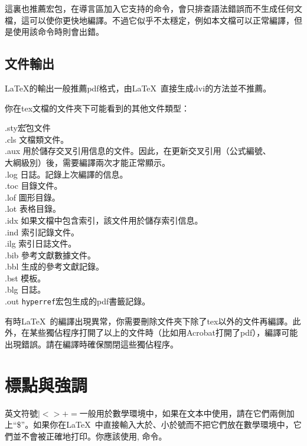 這裏也推薦宏包，在導言區加入它支持的命令，會只排查語法錯誤而不生成任何文檔，這可以使你更快地編譯。不過它似乎不太穩定，例如本文檔可以正常編譯，但是使用該命令時則會出錯。

\subsection{文件輸出}
\LaTeX{}的輸出一般推薦pdf格式，由\LaTeX\ 直接生成dvi的方法並不推薦。

你在tex文檔的文件夾下可能看到的其他文件類型：
\begin{tabbing}
	.sty{\hspace{2em}}\=宏包文件\\
	.cls	\> 文檔類文件。\\
	.aux    \> 用於儲存交叉引用信息的文件。因此，在更新交叉引用（公式編號、\\
	\> 大綱級別）後，需要編譯兩次才能正常顯示。\\
	.log    \> 日誌。記錄上次編譯的信息。\\
	.toc    \> 目錄文件。\\
	.lof    \> 圖形目錄。\\
	.lot    \> 表格目錄。\\
	.idx    \> 如果文檔中包含索引，該文件用於儲存索引信息。\\
	.ind	\> 索引記錄文件。\\
	.ilg	\> 索引日誌文件。\\
	.bib	\> \bibtex 參考文獻數據文件。\\
	.bbl	\> \bibtex 生成的參考文獻記錄。\\
	.bst	\> \bibtex 模板。\\
	.blg	\> \bibtex 日誌。\\
	.out	\> \texttt{hyperref}宏包生成的pdf書籤記錄。
\end{tabbing}

有時\LaTeX\ 的編譯出現異常，你需要刪除文件夾下除了tex以外的文件再編譯。此外，在某些獨佔程序打開了以上的文件時（比如用Acrobat打開了pdf），編譯可能出現錯誤。請在編譯時確保關閉這些獨佔程序。

\section{標點與強調}
英文符號$|<>+=$一般用於數學環境中，如果在文本中使用，請在它們兩側加上“\$”。如果你在\LaTeX\ 中直接輸入大於、小於號而不把它們放在數學環境中，它們並不會被正確地打印。你應該使用, 命令。

